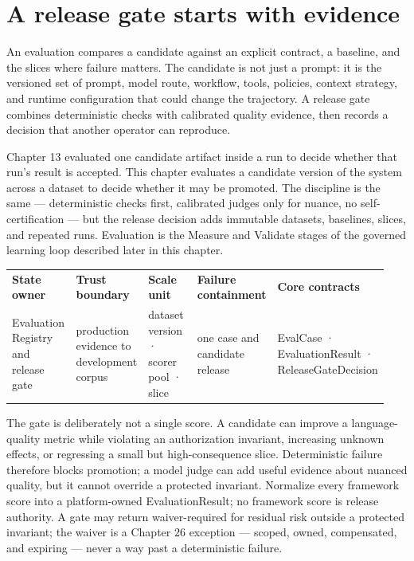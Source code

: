 \section{A release gate starts with evidence}

An evaluation compares a candidate against an explicit contract, a baseline, and the slices where failure matters. The candidate is not just a prompt: it is the versioned set of prompt, model route, workflow, tools, policies, context strategy, and runtime configuration that could change the trajectory. A release gate combines deterministic checks with calibrated quality evidence, then records a decision that another operator can reproduce.\par

Chapter 13 evaluated one candidate artifact inside a run to decide whether that run's result is accepted. This chapter evaluates a candidate version of the system across a dataset to decide whether it may be promoted. The discipline is the same — deterministic checks first, calibrated judges only for nuance, no self-certification — but the release decision adds immutable datasets, baselines, slices, and repeated runs. Evaluation is the Measure and Validate stages of the governed learning loop described later in this chapter.\par


\BookTableStart
\fontsize{7.2}{9}\selectfont
\begin{tabular}{@{}Y{0.1880\linewidth}Y{0.1880\linewidth}Y{0.1880\linewidth}Y{0.1880\linewidth}Y{0.1880\linewidth}@{}}
\color{white}\bfseries \textbf{State owner} & \color{white}\bfseries \textbf{Trust boundary} & \color{white}\bfseries \textbf{Scale unit} & \color{white}\bfseries \textbf{Failure containment} & \color{white}\bfseries \textbf{Core contracts} \\
Evaluation Registry and release gate & production evidence to development corpus & dataset version · scorer pool · slice & one case and candidate release & EvalCase · EvaluationResult · ReleaseGateDecision \\
\end{tabular}
\BookTableEnd

The gate is deliberately not a single score. A candidate can improve a language-quality metric while violating an authorization invariant, increasing unknown effects, or regressing a small but high-consequence slice. Deterministic failure therefore blocks promotion; a model judge can add useful evidence about nuanced quality, but it cannot override a protected invariant. Normalize every framework score into a platform-owned EvaluationResult; no framework score is release authority. A gate may return waiver-required for residual risk outside a protected invariant; the waiver is a Chapter 26 exception — scoped, owned, compensated, and expiring — never a way past a deterministic failure.\par


